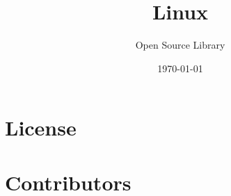 \documentclass[11pt,a4paper]{book}
\begin{document}
\frontmatter
\title{Linux}
\author{Open Source Library}
\date{\today}
\maketitle

\tableofcontents

\mainmatter{}

\chapter*{License}


\chapter*{Contributors}



\end{document}
